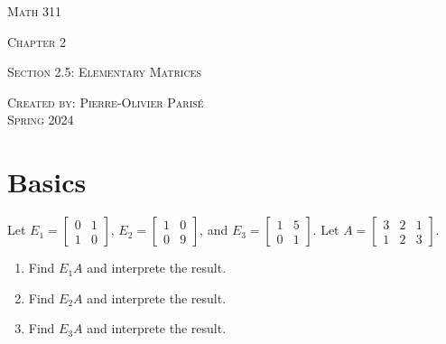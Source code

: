 \documentclass[20pt,a4paper]{extarticle}
\newcounter{example}
\begin{document}
\thispagestyle{empty}

\begin{center}
\vspace*{2.5cm}

{\Huge \textsc{Math 311}}

\vspace*{1.5cm}

{\LARGE \textsc{Chapter 2}} 

\vspace*{0.75cm}

\noindent\textsc{Section 2.5: Elementary Matrices}

\vspace*{0.75cm}

\tableofcontents

\vfill

\noindent \textsc{Created by: Pierre-Olivier Paris{\'e}} \\
\textsc{Spring 2024}
\end{center}

\newpage

\section{Basics}

\begin{example}
Let $E_1 = \begin{bmatrix} 0 & 1 \\ 1 & 0 \end{bmatrix}$, $E_2 = \begin{bmatrix} 1 & 0 \\ 0 & 9 \end{bmatrix}$, and $E_3 = \begin{bmatrix} 1 & 5 \\ 0 & 1 \end{bmatrix}$. Let $A = \begin{bmatrix} 3 & 2 & 1 \\ 1 & 2 & 3 \end{bmatrix}$.
	\begin{enumerate}[label=\alph*)]
		\item Find $E_1 A$ and interprete the result.
		\item Find $E_2 A$ and interprete the result.
		\item Find $E_3 A$ and interprete the result.
	\end{enumerate}
\end{example}

\begin{solution}

\end{solution}
\end{document}

